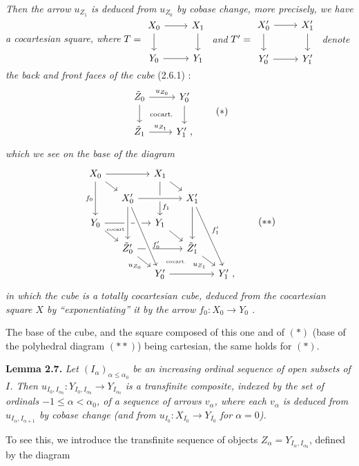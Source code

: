 

\textit{Then the arrow $u_{Z_1}$ is deduced from $u_{Z_0}$ by cobase change, more precisely, we have a cocartesian square, where} $T = \begin{tikzcd}[ampersand replacement=\&, baseline=(\tikzcdmatrixname.center)]
X_0 \arrow[r] \arrow[d] \& X_1 \arrow[d] \\
Y_0 \arrow[r] \& Y_1
\end{tikzcd}$ \textit{and} $T' = \begin{tikzcd}[ampersand replacement=\&, baseline=(\tikzcdmatrixname.center)]
X'_0 \arrow[r] \arrow[d] \& X'_1 \arrow[d] \\
Y'_0 \arrow[r] \& Y'_1
\end{tikzcd}$ \textit{denote the back and front faces of the cube} \textup{(2.6.1) :}
\[
\begin{tikzcd}
\tilde{Z}_0 \arrow[r, "u_{Z_0}"] \arrow[d] \arrow[dr, phantom, "\text{\scriptsize cocart.}"] & Y'_0 \arrow[d] \\
\tilde{Z}_1 \arrow[r, "u_{Z_1}"] & Y'_1 \ ,
\end{tikzcd}
\tag*{$(*)$}
\]
\textit{which we see on the base of the diagram}
\[
\begin{tikzcd}[row sep=small, column sep=small]
X_0 \arrow[rr] \arrow[dr] \arrow[dd, "f_0"'] & & X_1 \arrow[dr] \arrow[dd, "f_1" near end] & & \\
 & X'_0 \arrow[rr, crossing over] & & X'_1 \arrow[dd] \arrow[dddr, "f'_1"] & \\
Y_0 \arrow[rr] \arrow[dr] \arrow[dr, phantom, shift left=2ex, "\text{\tiny cocart.}"] & & Y_1 \arrow[dr] & & \\
 & \tilde{Z}'_0 \arrow[rr] \arrow[dr, "u_{Z_0}"'] \arrow[from=uu, crossing over] & & \tilde{Z}'_1 \arrow[dr, "u_{Z_1}"'] & \\
 & & Y'_0 \arrow[rr] \arrow[from=uuul, crossing over, "f'_0" near end] \arrow[ur, phantom, "\text{\tiny cocart.}"] & & Y'_1 \ ,
\end{tikzcd} %
\tag*{$(**)$}
\]
\textit{in which the cube is a totally cocartesian cube, deduced from the cocartesian square $X$ by ``exponentiating'' it by the arrow $f_0 : X_0 \longrightarrow Y_0$} \textit{.}

The base of the cube, and the square
composed of this one and of $(*)$ (base of the polyhedral diagram $(**)$) being cartesian, the same holds for $(*)$.

\textbf{Lemma 2.7.} \textit{Let $(I_\alpha)_{\alpha\leq\alpha_0}$ be an increasing ordinal sequence of open subsets of $I$. Then $u_{I_0,I_{\alpha_0}} : Y_{I_0,I_{\alpha_0}} \longrightarrow Y_{I_{\alpha_0}}$ is a transfinite composite, indexed by the set of ordinals $-1 \leq \alpha < \alpha_0$, of a sequence of arrows $v_\alpha$, where each $v_\alpha$ is deduced from $u_{I_\alpha,I_{\alpha+1}}$ by cobase change (and from $u_{I_0} : X_{I_0} \longrightarrow Y_{I_0}$ for $\alpha = 0$).}

To see this, we introduce the transfinite sequence of objects $Z_\alpha = Y_{I_\alpha,I_{\alpha_0}}$, defined by the diagram
